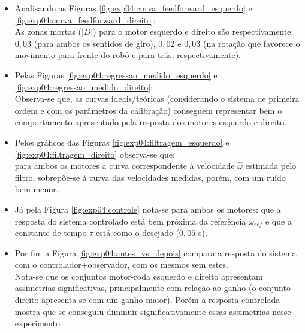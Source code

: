 \begin{itemize}
    \item Analisando as Figuras \ref{fig:exp04:curva_feedforward_esquerdo} e \ref{fig:exp04:curva_feedforward_direito}:\\
        As zonas mortas ($|D|$) para o motor esquerdo e direito são respectivamente: $0,03$ (para ambos os sentidos de giro), $0,02$ e $0,03$ (na rotação que favorece o movimento para frente do robô e para trás, respectivamente).
    \item Pelas Figuras \ref{fig:exp04:regressao_medido_esquerdo} e \ref{fig:exp04:regressao_medido_direito}:\\
        Observa-se que, as curvas ideais/teóricas (considerando o sistema de primeira ordem e com os parâmetros da calibração) conseguem representar bem o comportamento apresentado pela resposta dos motores esquerdo e direito.
    \item Pelos gráficos das Figuras \ref{fig:exp04:filtragem_esquerdo} e \ref{fig:exp04:filtragem_direito} observa-se que:\\
        para ambos os motores a curva correspondente à velocidade $\hat{\omega}$ estimada pelo filtro, sobrepõe-se à curva das velocidades medidas, porém, com um ruído bem menor.
    \item Já pela Figura \ref{fig:exp04:controle} nota-se para ambos os motores:
        que a resposta do sistema controlado está bem próxima da referência $\omega_{ref}$ e que a constante de tempo $\tau$ está como o desejado ($0,05$ s).
    \item Por fim a Figura \ref{fig:exp04:antes_vs_depois} compara a resposta do sistema com o controlador+observador, com os mesmos sem estes. \\
        Nota-se que os conjuntos motor-roda esquerdo e direito apresentam assimetrias significativas, principalmente com relação ao  ganho (o conjunto direito apresenta-se com um ganho maior). Porém a resposta controlada mostra que se conseguiu diminuir significativamente essas assimetrias nesse experimento.
\end{itemize}